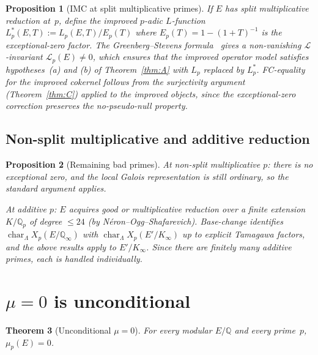 \documentclass[11pt]{amsart}
\newtheorem{theorem}{Theorem}[section]
\newtheorem{proposition}[theorem]{Proposition}
\theoremstyle{definition}
\theoremstyle{remark}
\newcommand{\Q}{\mathbb{Q}}
\newcommand{\Qp}{\mathbb{Q}_p}
\newcommand{\Lam}{\Lambda}
\newcommand{\Qinf}{\Q_\infty}
\DeclareMathOperator{\chr}{char}
\begin{document}
\begin{proposition}[IMC at split multiplicative primes]\label{prop:mult}
If $E$ has split multiplicative reduction at~$p$, define the improved
$p$-adic $L$-function $L_p^*(E,T):=L_p(E,T)/E_p(T)$ where
$E_p(T)=1-(1+T)^{-1}$ is the exceptional-zero factor.  The
Greenberg--Stevens formula~\textup{\cite{GS}} gives a non-vanishing
$\mathcal L$-invariant $\mathcal L_p(E)\ne 0$, which ensures that
the improved operator model satisfies hypotheses~\textup{(a)} and
\textup{(b)} of Theorem~\ref{thm:A} with $L_p$ replaced by $L_p^*$.
FC-equality for the improved cokernel follows from the surjectivity
argument \textup{(}Theorem~\ref{thm:C}\textup{)} applied to the
improved objects, since the exceptional-zero correction preserves the
no-pseudo-null property.
\end{proposition}

\subsection{Non-split multiplicative and additive reduction}

\begin{proposition}[Remaining bad primes]\label{prop:bad}
At non-split multiplicative $p$: there is no exceptional zero, and
the local Galois representation is still ordinary, so the standard
argument applies.

At additive $p$: $E$ acquires good or multiplicative reduction over
a finite extension $K/\Qp$ of degree $\le 24$
\textup{(}by N\'eron--Ogg--Shafarevich\textup{)}.  Base-change
identifies $\chr_\Lam X_p(E/\Qinf)$ with $\chr_\Lam X_p(E'/K_\infty)$
up to explicit Tamagawa factors, and the above results apply to
$E'/K_\infty$.  Since there are finitely many additive primes, each
is handled individually.
\end{proposition}

\section{$\mu=0$ is unconditional}\label{sec:mu-zero}

\begin{theorem}[Unconditional $\mu=0$]\label{thm:mu-zero}
For every modular $E/\Q$ and every prime~$p$, $\mu_p(E)=0$.
\end{theorem}
\end{document}
